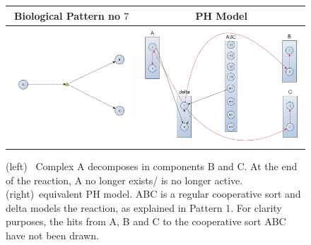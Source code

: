 \documentclass[11pt,a4paper,twoside]{epig}
\begin{document}
\begin{figure}[ht]
\begin{tabular}{|c|c|}
\hline
Biological Pattern no $7$ & PH Model \\
\hline
  \includegraphics[scale=0.3]{./imagesannexe/phdrawings/7cyt.jpg} & \includegraphics[scale=0.15]{./imagesannexe/phdrawings/7ph.jpg} \\
 \hline
\end{tabular}
\caption{\label{fig:pattern:7}
(left)~ Complex A decomposes in components B and C. At the end of the reaction, A no longer exists/ is no
longer active.
(right)~equivalent PH model. ABC is a regular cooperative sort and delta models the reaction,
as explained in Pattern 1. For clarity purposes, the hits from A, B and C to the cooperative
sort ABC have not been drawn.
}
\end{figure}
\end{document}

